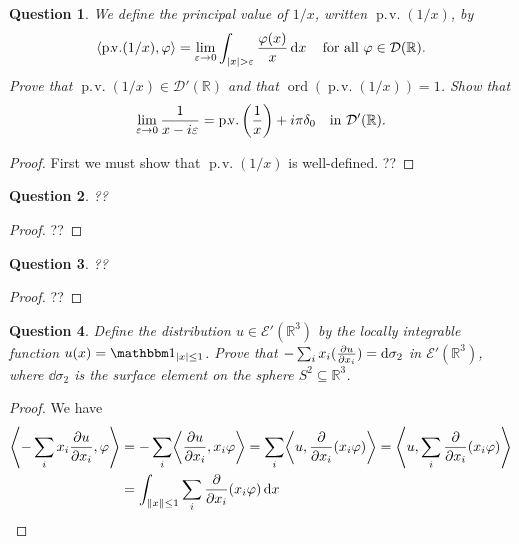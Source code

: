 \documentclass{article}
\theoremstyle{plain}
\newtheorem{question}{Question}
\theoremstyle{remark}
\renewcommand{\epsilon}{\varepsilon}
\renewcommand{\phi}{\varphi}
\newcommand{\Bb}{\mathbb}
\newcommand{\Cal}{\mathcal}
\newcommand{\RR}{\Bb R}
\newcommand{\EE}{\Cal E}
\newcommand{\DD}{\Cal D}
\DeclarePairedDelimiter{\ang}{\langle}{\rangle}
\newcommand\eps\epsilon
\newcommand\ind{\mathbbm 1} %
\DeclareMathOperator{\ord}{ord}
\DeclareMathOperator{\prv}{p.\!v.}
\begin{document}
\begin{question}
	We define the \emph{principal value} of $1/x$, written $\prv(1/x)$, by
	\[
	\ang*{\prv(1/x), \phi} = \lim_{\eps \to 0} \int_{\abs{x} > \eps} \frac{\phi(x)}{x} \dd{x} \quad\text{for all $\phi \in \DD(\RR)$}. 
	\]
	Prove that $\prv(1/x) \in \DD'(\RR)$ and that $\ord(\prv(1/x)) = 1$. Show that
	\[
	\lim_{\eps \to 0} \frac{1}{x - i\eps} = \prv\qty(\frac1x) + i\pi \delta_0 \quad\text{in $\DD'(\RR)$}. 
	\]
\end{question}

\begin{proof}
	First we must show that $\prv(1/x)$ is well-defined.  ??
\end{proof}

\begin{question}
	??
\end{question}
\begin{proof}
	??
\end{proof}

\begin{question}
	??
\end{question}

\begin{proof}
	??
\end{proof}

\begin{question}
	Define the distribution $u \in \EE'(\RR^3)$ by the locally integrable function $u(x) = \ind_{\abs{x}\leq 1}$. Prove that $-\sum_i x_i (\pdv{u}{x_i}) = \dd{\sigma_2}$ in $\EE'(\RR^3)$, where $\dd{\sigma_2}$ is the surface element on the sphere $S^2 \subseteq \RR^3$. 
\end{question}

\begin{proof}
	We have
	\begin{align*}
		\ang*{- \sum_i x_i \pdv{u}{x_i}, \phi} &= - \sum_i \ang*{\pdv{u}{x_i}, x_i\phi} = \sum_i \ang*{u, \pdv{x_i}(x_i \phi)} = \ang*{u, \sum_i \pdv{x_i}(x_i\phi)} \\
		&= \int_{\norm{x} \leq 1} \sum_i \pdv{x_i}(x_i\phi) \dd{x}
	\end{align*}
\end{proof}
\end{document}
